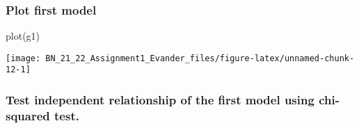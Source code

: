 \documentclass[
]{article}
\newenvironment{Shaded}{\begin{snugshade}}{\end{snugshade}}
\newcommand{\AttributeTok}[1]{\textcolor[rgb]{0.77,0.63,0.00}{#1}}
\newcommand{\ConstantTok}[1]{\textcolor[rgb]{0.00,0.00,0.00}{#1}}
\newcommand{\DecValTok}[1]{\textcolor[rgb]{0.00,0.00,0.81}{#1}}
\newcommand{\FunctionTok}[1]{\textcolor[rgb]{0.00,0.00,0.00}{#1}}
\newcommand{\NormalTok}[1]{#1}
\newcommand{\OtherTok}[1]{\textcolor[rgb]{0.56,0.35,0.01}{#1}}
\newcommand{\SpecialCharTok}[1]{\textcolor[rgb]{0.00,0.00,0.00}{#1}}
\newcommand{\StringTok}[1]{\textcolor[rgb]{0.31,0.60,0.02}{#1}}
\begin{document}
\normalsize

\hypertarget{plot-first-model}{%
\subsubsection{Plot first model}\label{plot-first-model}}

\begin{Shaded}
\begin{Highlighting}[]
\FunctionTok{plot}\NormalTok{(g1)}
\end{Highlighting}
\end{Shaded}

\begin{center}\texttt{[image: BN\_21\_22\_Assignment1\_Evander\_files/figure-latex/unnamed-chunk-12-1]} \end{center}
\newpage

\hypertarget{test-independent-relationship-of-the-first-model-using-chi-squared-test.}{%
\subsubsection{Test independent relationship of the first model using
chi-squared
test.}\label{test-independent-relationship-of-the-first-model-using-chi-squared-test.}}

\begin{Shaded}
\end{Shaded}
\end{document}
